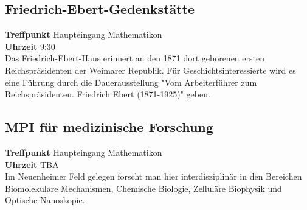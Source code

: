 \subsection*{Friedrich-Ebert-Gedenkstätte}
\textbf{Treffpunkt} Haupteingang Mathematikon\\
\textbf{Uhrzeit} 9:30\\
Das Friedrich-Ebert-Haus erinnert an den 1871 dort geborenen ersten Reichspräsidenten der Weimarer Republik. Für Geschichtsinteressierte wird es eine Führung durch die Dauerausstellung "Vom Arbeiterführer zum Reichspräsidenten. Friedrich Ebert (1871-1925)" geben.

\subsection*{MPI für medizinische Forschung}
\textbf{Treffpunkt} Haupteingang Mathematikon\\
\textbf{Uhrzeit} TBA\\
Im Neuenheimer Feld gelegen forscht man hier interdisziplinär in den Bereichen Biomolekulare Mechanismen, Chemische Biologie, Zelluläre Biophysik und Optische Nanoskopie. 